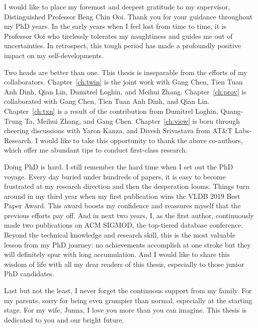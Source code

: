 \begin{acknowledgments}

I would like to place my foremost and deepest gratitude to my supervisor, Distinguished Professor Beng Chin Ooi. 
Thank you for your guidance throughout my PhD years. 
In the early years when I feel lost from time to time, it is Professor Ooi who tirelessly tolerates my naughtiness and guides me out of uncertainties. 
In retrospect, this tough period has made a profoundly positive impact on my self-developments.

Two heads are better than one. This thesis is inseparable from the efforts of my collaborators. 
Chapter~\ref{ch:twin} is the joint work with Gang Chen, Tien Tuan Anh Dinh, Qian Lin, Dumitrel Loghin, and Meihui Zhang. 
Chapter~\ref{ch:prov} is collaborated with Gang Chen, Tien Tuan Anh Dinh, and Qian Lin. 
Chapter~\ref{ch:txn} is a result of the contribution from Dumitrel Loghin, Quang-Trung Ta, Meihui Zhang, and Gang Chen.
Chapter~\ref{ch:view} is born through cheering discussions with Yaron Kanza, and Divesh Srivastava from AT\&T Labs-Research.
I would like to take this opportunity to thank the above co-authors, which offer me abundant tips to conduct first-class research. 


Doing PhD is hard. I still remember the hard time when I set out the PhD voyage. Every day buried under hundreds of papers, it is easy to become frustrated at my research direction and then the desperation looms. 
Things turn around in my third year when my first publication wins the VLDB 2019 Best Paper Award. This award boosts my confidence and reassures myself that the previous efforts pay off. 
And in next two years, I, as the first author, continuously made two publications on ACM SIGMOD, the top-tiered database conference.
Beyond the technical knowledge and research skill, this is the most valuable lesson from my PhD journey: no achievements accomplish at one stroke but they will definitely spur with long accumulation.  
And I would like to share this wisdom of life with all my dear readers of this thesis, especially to those junior PhD candidates. 

Last but not the least, I never forget the continuous support from my family. For my parents, sorry for being even grumpier than normal, especially at the starting stage. For my wife, Junna, I love you more than you can imagine. This thesis is dedicated to you and our bright future. 
    

\end{acknowledgments}
